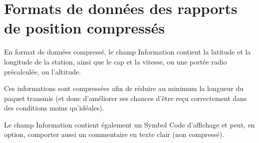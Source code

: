 \chapter[FORMATS DE DONNÉES DES RAPPORTS DE POSITION COMPRESSÉS]{Formats de données des rapports de
position compressés}\label{formats-de-donnees-des-rapports-de-position-compresses}

\newcommand{\chNineHead}[1]{\shortstack{\sffamily\bfseries\itshape #1}}
\newcommand{\chNineHeadCode}[2]{%
  \shortstack{\sffamily\bfseries\itshape #1\\[-0.3ex]
    \normalfont\ttfamily #2}%
}
\newcommand{\chNineBytes}[1]{%
  \makebox[0pt][r]{Bytes:\hspace{1.2em}}%
  \makebox[\linewidth][c]{#1}%
}
\newcommand{\chNineCompressedHead}{%
  \makebox[\linewidth][c]{%
  \begin{tabular}{@{}>{\centering\arraybackslash\sffamily\bfseries\itshape}p{\dimexpr\linewidth+2\tabcolsep\relax}@{}}
  \resizebox{0.94\linewidth}{!}{\sffamily\bfseries\itshape Compressed Course/Speed} \\
  \hline
  \resizebox{0.94\linewidth}{!}{\sffamily\bfseries\itshape Compressed Radio Range} \\
  \hline
  \resizebox{0.94\linewidth}{!}{\sffamily\bfseries\itshape Compressed Altitude}
  \end{tabular}}%
}
\newcommand{\chNineProto}[1]{\aprsorigtexttt{#1}}
\newcommand{\chNineExampleText}[1]{{\rmfamily\normalsize #1}}

\begin{aprsbodyblock}
En format de données compressé, le champ Information contient la latitude et
la longitude de la station, ainsi que le cap et la vitesse, ou une portée radio
précalculée, ou l'altitude.

Ces informations sont compressées afin de réduire au minimum la longueur du
paquet transmis (et donc d'améliorer ses chances d'être reçu correctement dans
des conditions moins qu'idéales).

Le champ Information contient également un Symbol Code d'affichage et peut,
en option, comporter aussi un commentaire en texte clair (non compressé).
\end{aprsbodyblock}

